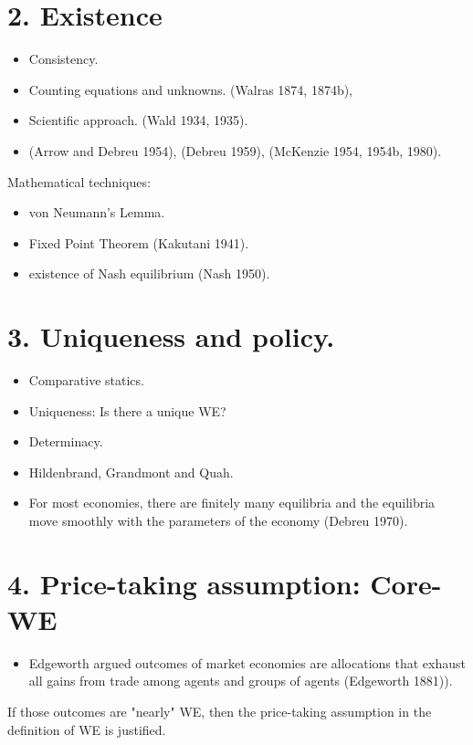 \documentclass[10pt]{article}
\begin{document}
\section*{2. Existence}
\begin{itemize}
  \item Consistency.
  \item Counting equations and unknowns. (Walras 1874, 1874b),
  \item Scientific approach. (Wald 1934, 1935).
  \item (Arrow and Debreu 1954), (Debreu 1959), (McKenzie 1954, 1954b, 1980).
\end{itemize}

Mathematical techniques:

\begin{itemize}
  \item von Neumann's Lemma.
  \item Fixed Point Theorem (Kakutani 1941).
  \item existence of Nash equilibrium (Nash 1950).
\end{itemize}

\section*{3. Uniqueness and policy.}
\begin{itemize}
  \item Comparative statics.
  \item Uniqueness: Is there a unique WE?
  \item Determinacy.
  \item Hildenbrand, Grandmont and Quah.
  \item For most economies, there are finitely many equilibria and the equilibria move smoothly with the parameters of the economy (Debreu 1970).
\end{itemize}

\section*{4. Price-taking assumption: Core-WE}
\begin{itemize}
  \item Edgeworth argued outcomes of market economies are allocations that exhaust all gains from trade among agents and groups of agents (Edgeworth 1881)).
\end{itemize}

If those outcomes are "nearly" WE, then the price-taking assumption in the definition of WE is justified.
\end{document}
